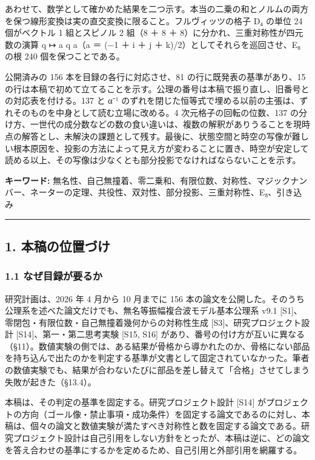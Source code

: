 \documentclass[
  a4paper,
]{ltjsarticle}
\begin{document}
あわせて、数学として確かめた結果を二つ示す。本当の二乗の和とノルムの両方を保つ線形変換は実の直交変換に限ること。フルヴィッツの格子
D₄ の単位 24 個がベクトル 1 組とスピノル 2 組（8 ＋ 8 ＋
8）に分かれ、三重対称性が四元数の演算 q ↦ a q a（a ＝ (−1 ＋ i ＋ j ＋
k)/2）としてそれらを巡回させ、E₈ の根 240 個を保つことである。

公開済みの 156 本を目録の各行に対応させ、81 の行に既発表の基準があり、15
の行は本稿で初めて立てることを示す。公理の番号は本稿で振り直し、旧番号との対応表を付ける。137
と α⁻¹
のずれを閉じた恒等式で埋める以前の主張は、ずれそのものを中身として読む立場に改める。4
次元格子の回転の位数、137
の分け方、一世代の成分数などの数の食い違いは、複数の解釈がありうることを現時点の解答とし、未解決の課題として残す。最後に、状態空間と時空の写像が難しい根本原因を、投影の方法によって見え方が変わることに置き、時空が安定して読める以上、その写像は少なくとも部分投影でなければならないことを示す。

\textbf{キーワード:}
無名性、自己無撞着、零二乗和、有限位数、対称性、マジックナンバー、ネーターの定理、共役性、双対性、部分投影、三重対称性、E₈、引き込み

\begin{center}\rule{0.5\linewidth}{0.5pt}\end{center}

\subsection{1.
本稿の位置づけ}\label{ux672cux7a3fux306eux4f4dux7f6eux3065ux3051}

\subsubsection{1.1
なぜ目録が要るか}\label{ux306aux305cux76eeux9332ux304cux8981ux308bux304b}

研究計画は、2026 年 4 月から 10 月までに 156
本の論文を公開した。そのうち公理系を述べた論文だけでも、無名等振幅複合波モデル基本公理系
v9.1 {[}S1{]}、零閉包・有限位数・自己無撞着幾何からの対称性生成
{[}S3{]}、研究プロジェクト設計 {[}S14{]}、第一・第二思考実験 {[}S15,
S16{]}
があり、番号の付け方が互いに異なる（§11）。数値実験の側では、ある結果が骨格から導かれたのか、骨格にない部品を持ち込んで出たのかを判定する基準が文書として固定されていなかった。筆者の数値実験でも、結果が合わないたびに部品を差し替えて「合格」させてしまう失敗が起きた（§13.4）。

本稿は、その判定の基準を固定する。研究プロジェクト設計 {[}S14{]}
がプロジェクトの方向（ゴール像・禁止事項・成功条件）を固定する論文であるのに対し、本稿は、個々の論文と数値実験が満たすべき対称性と数を固定する論文である。研究プロジェクト設計は自己引用をしない方針をとったが、本稿は逆に、どの論文を答え合わせの基準にするかを定めるため、自己引用と外部引用を網羅する。
\end{document}
